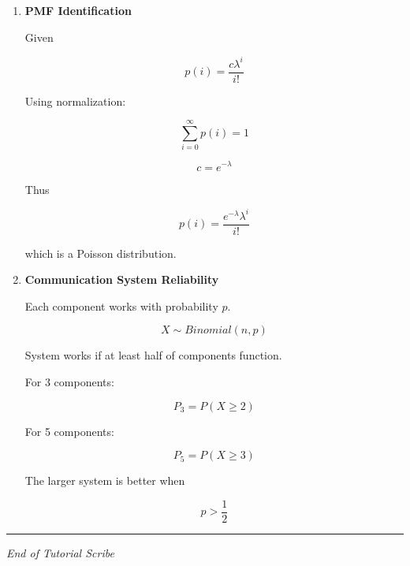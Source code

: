 \documentclass[11pt]{article}
\begin{document}
\begin{enumerate}[label=\textbf{Question \arabic*:}]
\[
P(\text{correct})=
\sum_{k=8}^{12}\binom{12}{k}\theta^k(1-\theta)^{12-k}
\]

\newpage

\item \textbf{PMF Identification}

Given

\[
p(i)=\frac{c\lambda^i}{i!}
\]

Using normalization:

\[
\sum_{i=0}^{\infty}p(i)=1
\]

\[
c=e^{-\lambda}
\]

Thus

\[
p(i)=\frac{e^{-\lambda}\lambda^i}{i!}
\]

which is a Poisson distribution.

\newpage

\item \textbf{Communication System Reliability}

Each component works with probability $p$.

\[
X\sim Binomial(n,p)
\]

System works if at least half of components function.

For 3 components:

\[
P_3=P(X\ge2)
\]

For 5 components:

\[
P_5=P(X\ge3)
\]

The larger system is better when

\[
p>\frac{1}{2}
\]

\end{enumerate}

\bigskip

\hrule
\vspace{0.3cm}

\begin{center}
\small \textit{End of Tutorial Scribe}
\end{center}
\end{document}
